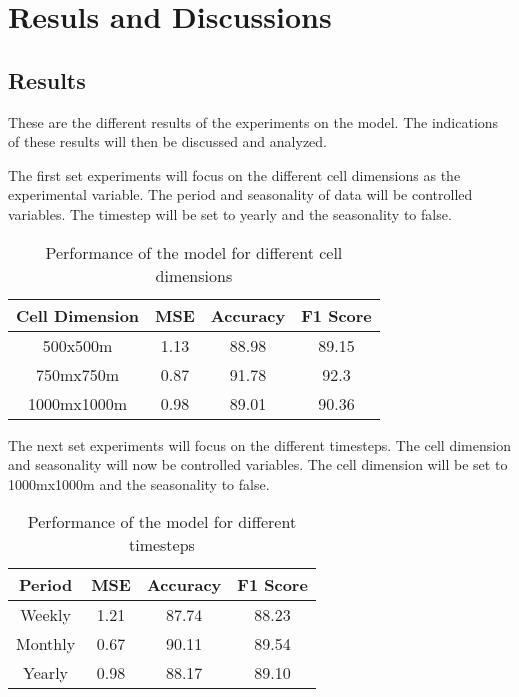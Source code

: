 
\chapter{Resuls and Discussions}  %

\section{Results}
    These are the different results of the experiments on the model. The indications of these results will then be discussed and analyzed.

    The first set experiments will focus on the different cell dimensions as the experimental variable. The period and seasonality of data will be controlled variables. The timestep will be set to yearly and the seasonality to false.

    \begin{table}[h]
      \centering
      \begin{tabular}{|c|c|c|c|}
            \hline
          \textbf{Cell Dimension}  &\textbf{MSE}  &\textbf{Accuracy} &\textbf{F1 Score}\\ 
          \hline
          500x500m &1.13 &88.98 &89.15 \\
          750mx750m &0.87 &91.78 &92.3 \\
          1000mx1000m  &0.98 &89.01 &90.36 \\
          \hline
        \end{tabular}
      \caption{Performance of the model for different cell dimensions}
    \end{table}

    The next set experiments will focus on the different timesteps. The cell dimension and seasonality will now be controlled variables. The cell dimension will be set to 1000mx1000m and the seasonality to false.
    \begin{table}[h]
      \centering
      \begin{tabular}{|c|c|c|c|}
            \hline
          \textbf{Period}  &\textbf{MSE}  &\textbf{Accuracy} &\textbf{F1 Score}\\ 
          \hline
          Weekly &1.21 &87.74 &88.23 \\
          Monthly &0.67 &90.11 &89.54 \\
          Yearly   &0.98 &88.17 &89.10 \\
          \hline
        \end{tabular}
      \caption{Performance of the model for different timesteps}
    \end{table}

